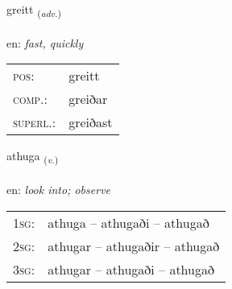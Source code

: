 \documentclass[frontgrid, backgrid]{flacards}\usepackage[]{graphicx}\usepackage[]{color}
\begin{document}
\renewcommand{\flhead}{\vskip5pt \fboxsep=0pt {\small\bfseries\footnotesize Atviksorð | Adverb}}
\renewcommand{\fcfoot}{\vskip5pt \fboxsep=0pt \hspace{2pt}{\small\bfseries\footnotesize 2K}}

\renewcommand{\blhead}{\vskip5pt {\small\bfseries\footnotesize Atviksorð | Adverb }}
\renewcommand{\bcfoot}{\vskip5pt \hspace{2pt}{\small\bfseries\footnotesize 2K}}


{greitt \small{\textsubscript{(\textit{adv.})}} \\[1ex] %
\textphonetic{[kreiht]} \\
en: \emph{fast, quickly} \\  [2ex]
\renewcommand*{\arraystretch}{0.8}
\begin{tabular}{ll}
\textsc{pos}: & greitt \\ 
\textsc{comp.}: & greiðar \\ 
\textsc{superl.}: & greiðast \\
\end{tabular}
}

\renewcommand{\flhead}{\vskip5pt \fboxsep=0pt {\small\bfseries\footnotesize Sagnorð | Verb}}
\renewcommand{\fcfoot}{\vskip5pt \fboxsep=0pt \hspace{2pt}{\small\bfseries\footnotesize 2K}}

\renewcommand{\blhead}{\vskip5pt {\small\bfseries\footnotesize Sagnorð | Verb }}
\renewcommand{\bcfoot}{\vskip5pt \hspace{2pt}{\small\bfseries\footnotesize 2K}}


{athuga \small{\textsubscript{(\textit{v.})}} \\[1ex] %
\textphonetic{[aːthʏɣa]} \\
en: \emph{look into; observe} \\  [2ex]
\renewcommand*{\arraystretch}{0.8}
\begin{tabular}{p{1cm}l}
\textsc{1sg}: & athuga -- athugaði -- athugað \\ 
\textsc{2sg}: & athugar -- athugaðir -- athugað \\ 
\textsc{3sg}: & athugar -- athugaði -- athugað \\ 
\end{tabular}
}
\end{document}
